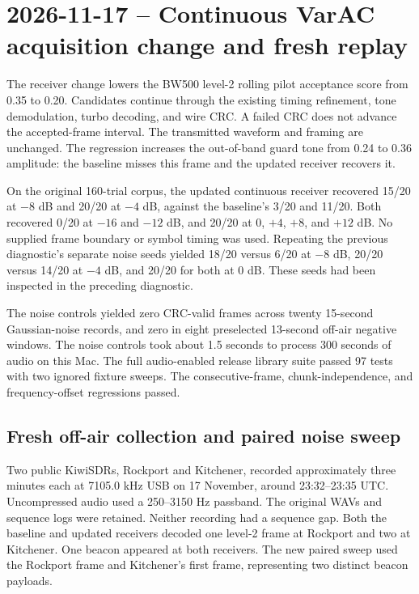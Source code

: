 \documentclass[11pt,a4paper]{article}
\begin{document}
\section{2026-11-17 -- Continuous VarAC acquisition change and fresh replay}

The receiver change lowers the BW500 level-2 rolling pilot acceptance
score from 0.35 to 0.20. Candidates continue through the existing
timing refinement, tone demodulation, turbo decoding, and wire CRC.
A failed CRC does not advance the accepted-frame interval. The
transmitted waveform and framing are unchanged. The regression
increases the out-of-band guard tone from 0.24 to 0.36 amplitude:
the baseline misses this frame and the updated receiver recovers it.

On the original 160-trial corpus, the updated continuous receiver
recovered 15/20 at $-8$ dB and 20/20 at $-4$ dB, against the
baseline's 3/20 and 11/20. Both recovered 0/20 at $-16$ and $-12$ dB,
and 20/20 at $0$, $+4$, $+8$, and $+12$ dB. No supplied frame
boundary or symbol timing was used. Repeating the previous
diagnostic's separate noise seeds yielded 18/20 versus 6/20 at
$-8$ dB, 20/20 versus 14/20 at $-4$ dB, and 20/20 for both at
$0$ dB. These seeds had been inspected in the preceding diagnostic.

The noise controls yielded zero CRC-valid frames across twenty
15-second Gaussian-noise records, and zero in eight preselected
13-second off-air negative windows. The noise controls took about
1.5 seconds to process 300 seconds of audio on this Mac.
The full audio-enabled release library suite passed 97 tests with two
ignored fixture sweeps. The consecutive-frame, chunk-independence,
and frequency-offset regressions passed.

\subsection{Fresh off-air collection and paired noise sweep}

Two public KiwiSDRs, Rockport and Kitchener, recorded approximately
three minutes each at 7105.0 kHz USB on 17 November, around
23:32--23:35 UTC. Uncompressed audio used a 250--3150 Hz passband.
The original WAVs and sequence logs were retained. Neither recording
had a sequence gap. Both the baseline and updated receivers decoded
one level-2 frame at Rockport and two at Kitchener. One beacon appeared
at both receivers. The new paired sweep used the Rockport frame and
Kitchener's first frame, representing two distinct beacon payloads.
\end{document}
